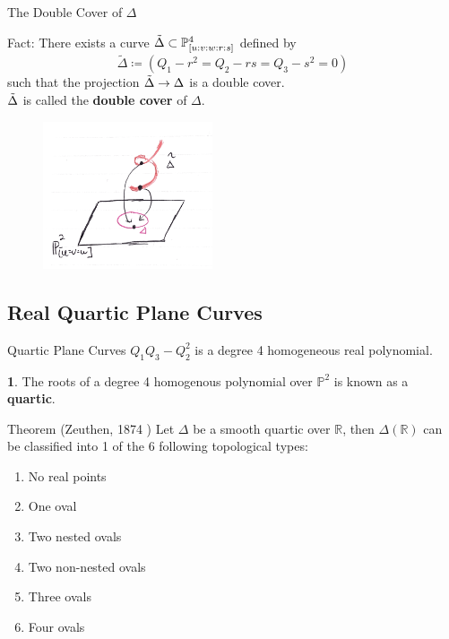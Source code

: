 \documentclass[hyperref, notheorems]{beamer}
\newcommand{\Rbb}{\mathbb{R}}
\newcommand{\Pbb}{\mathbb{P}}
\theoremstyle{definition}
\newtheorem{definition}{\translate{Definition}}
\begin{document}
\begin{frame}{The Double Cover of $\Delta$}
    \begin{block}{Fact:}
        There exists a curve $\Tilde{\Delta} \subset \Pbb^4_{[u:v:w:r:s]}$ defined by
        \[\tilde{\Delta} \coloneqq (Q_1 - r^2 = Q_2 - rs = Q_3 - s^2 = 0)\]
        such that the projection $\Tilde{\Delta} \to \Delta$ is a double cover.\\ $\Tilde{\Delta}$ is called the \textbf{double cover} of $\Delta$. 
    \end{block}
    \begin{figure}[h]
    \includegraphics[width=5cm]{graphics/double_cover.png}
\end{figure}
\end{frame}

\subsection{Real Quartic Plane Curves}

\begin{frame}{Quartic Plane Curves}
$Q_1Q_3 - Q_2^2$ is a degree 4 homogeneous real polynomial.
\begin{definition}
The roots of a degree 4 homogenous polynomial over $\Pbb^2$ is known as a \textbf{quartic}.
\end{definition}
        \begin{block}{Theorem (Zeuthen, 1874 \cite{Zeuthen1874})}
       Let $\Delta$ be a smooth quartic over $\Rbb$, then $\Delta(\Rbb)$ can be classified into 1 of the 6 following topological types:
       \begin{enumerate}
           \item No real points
           \item One oval
           \item Two nested ovals
           \item Two non-nested ovals
           \item Three ovals
           \item Four ovals
       \end{enumerate}
        \end{block}
\end{frame}
\end{document}

